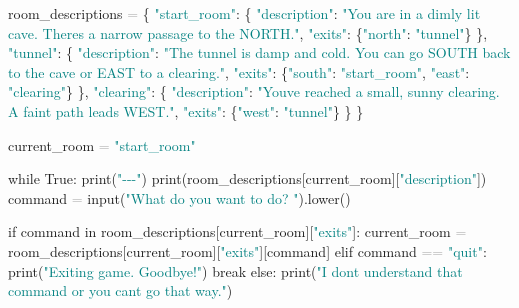 \documentclass[
  justified,
  openright,
]{tufte-book}
\newcommand{\BuiltInTok}[1]{#1}
\newcommand{\ControlFlowTok}[1]{\textcolor{BrandBlue}{#1}}
\newcommand{\KeywordTok}[1]{\textcolor{BrandBlue}{#1}}
\newcommand{\NormalTok}[1]{#1}
\newcommand{\OperatorTok}[1]{\textcolor{DarkGray}{#1}}
\newcommand{\StringTok}[1]{\textcolor{Teal}{#1}}
\newcommand{\VariableTok}[1]{#1}
\newenvironment{Shaded}{%
  \begin{snugshade}
}{%
  \end{snugshade}
}
\begin{document}
\begin{Shaded}
\begin{Highlighting}[]
\NormalTok{room\_descriptions }\OperatorTok{=}\NormalTok{ \{}
    \StringTok{"start\_room"}\NormalTok{: \{}
        \StringTok{"description"}\NormalTok{: }\StringTok{"You are in a dimly lit cave. There\textquotesingle{}s a narrow passage to the NORTH."}\NormalTok{,}
        \StringTok{"exits"}\NormalTok{: \{}\StringTok{"north"}\NormalTok{: }\StringTok{"tunnel"}\NormalTok{\}}
\NormalTok{    \},}
    \StringTok{"tunnel"}\NormalTok{: \{}
        \StringTok{"description"}\NormalTok{: }\StringTok{"The tunnel is damp and cold. You can go SOUTH back to the cave or EAST to a clearing."}\NormalTok{,}
        \StringTok{"exits"}\NormalTok{: \{}\StringTok{"south"}\NormalTok{: }\StringTok{"start\_room"}\NormalTok{, }\StringTok{"east"}\NormalTok{: }\StringTok{"clearing"}\NormalTok{\}}
\NormalTok{    \},}
    \StringTok{"clearing"}\NormalTok{: \{}
        \StringTok{"description"}\NormalTok{: }\StringTok{"You\textquotesingle{}ve reached a small, sunny clearing. A faint path leads WEST."}\NormalTok{,}
        \StringTok{"exits"}\NormalTok{: \{}\StringTok{"west"}\NormalTok{: }\StringTok{"tunnel"}\NormalTok{\}}
\NormalTok{    \}}
\NormalTok{\}}

\NormalTok{current\_room }\OperatorTok{=} \StringTok{"start\_room"}

\ControlFlowTok{while} \VariableTok{True}\NormalTok{:}
    \BuiltInTok{print}\NormalTok{(}\StringTok{"{-}{-}{-}"}\NormalTok{)}
    \BuiltInTok{print}\NormalTok{(room\_descriptions[current\_room][}\StringTok{"description"}\NormalTok{])}
\NormalTok{    command }\OperatorTok{=} \BuiltInTok{input}\NormalTok{(}\StringTok{"What do you want to do? "}\NormalTok{).lower()}

    \ControlFlowTok{if}\NormalTok{ command }\KeywordTok{in}\NormalTok{ room\_descriptions[current\_room][}\StringTok{"exits"}\NormalTok{]:}
\NormalTok{        current\_room }\OperatorTok{=}\NormalTok{ room\_descriptions[current\_room][}\StringTok{"exits"}\NormalTok{][command]}
    \ControlFlowTok{elif}\NormalTok{ command }\OperatorTok{==} \StringTok{"quit"}\NormalTok{:}
        \BuiltInTok{print}\NormalTok{(}\StringTok{"Exiting game. Goodbye!"}\NormalTok{)}
        \ControlFlowTok{break}
    \ControlFlowTok{else}\NormalTok{:}
        \BuiltInTok{print}\NormalTok{(}\StringTok{"I don\textquotesingle{}t understand that command or you can\textquotesingle{}t go that way."}\NormalTok{)}
\end{Highlighting}
\end{Shaded}
\end{document}
